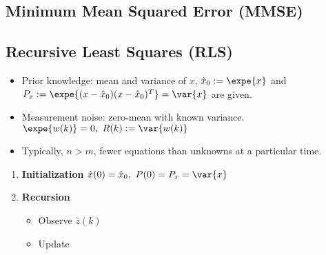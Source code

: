 \documentclass[10pt,a4paper]{scrartcl}
\begin{document}
\begin{multicols*}{2}


\subsection{Minimum Mean Squared Error (MMSE)}


\subsection{Recursive Least Squares (RLS)}


\begin{itemize}
\item Prior knowledge: mean and variance of $x$, $\hat{x}_0:=\expe{x}$ and $P_x:=\expe{(x-\hat{x}_0)(x-\hat{x}_0)^T}=\var{x}$ are given.
\item Measurement noise: zero-mean with known variance. $\expe{w(k)}=0,\ R(k):=\var{w(k)}$
\item Typically, $n>m$, fewer equations than unknowns at a particular time.
\end{itemize}

\begin{enumerate}
\item \textbf{Initialization} $\hat{x}(0)=\hat{x}_0,\ P(0)=P_x=\var{x}$
\item \textbf{Recursion}
\begin{itemize}
\item Observe $\bar{z}(k)$
\item Update

\end{itemize}
\end{enumerate}


\end{multicols*}
\end{document}
